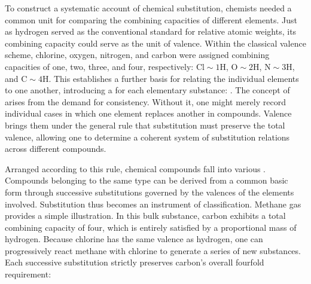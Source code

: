 \documentclass[submitted,12pt]{article}
\providecommand{\DIFaddbegin}{} %
\providecommand{\DIFaddend}{} %
\providecommand{\DIFdelbegin}{} %
\providecommand{\DIFdelend}{} %
\begin{document}
\DIFaddbegin 


\DIFaddend To construct a systematic account of chemical substitution, chemists needed a common unit for comparing the combining capacities of different elements. Just as hydrogen served as the conventional standard for relative atomic weights, its combining capacity could serve as the unit of valence. Within the classical valence scheme, chlorine, oxygen, nitrogen, and carbon were assigned combining capacities of one, two, three, and four, respectively: $\mathrm{Cl}\sim 1\mathrm{H}$, $\mathrm{O}\sim 2\mathrm{H}$, $\mathrm{N}\sim 3\mathrm{H}$, and $\mathrm{C}\sim 4\mathrm{H}$. This establishes a further basis for relating the individual elements to one another, introducing a  for each elementary substance: \DIFdelbegin %
\DIFdelend \DIFaddbegin {} \DIFaddend {}. The concept of  arises from the demand for consistency. Without it, one might merely record individual cases in which one element replaces another in compounds. Valence brings them under the general rule that substitution must preserve the total valence, allowing one to determine a coherent system of substitution relations across different compounds.

Arranged according to this rule, chemical compounds fall into various   . Compounds belonging to the same type can be derived from a common basic form through successive substitutions governed by the valences of the elements involved. Substitution thus becomes an instrument of classification. Methane gas provides a simple illustration. In this bulk substance, carbon exhibits a total combining capacity of four, which is entirely satisfied by a proportional mass of hydrogen. Because chlorine has the same valence as hydrogen, one can progressively react methane with chlorine to generate a series of new substances. Each successive substitution strictly preserves carbon's overall fourfold requirement: 
\end{document}
